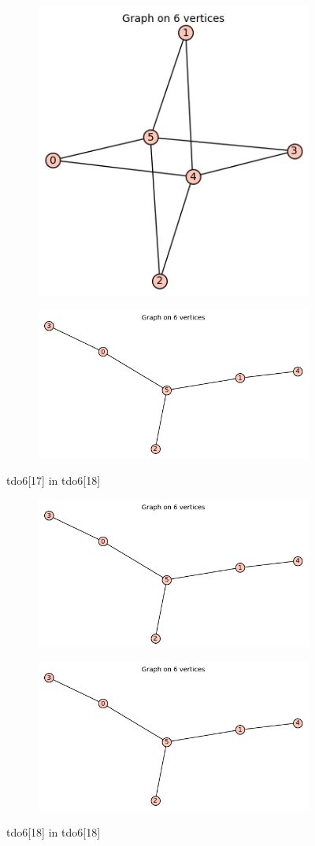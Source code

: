 \documentclass[12pt, a4paper]{article}
\begin{document}
\begin{center}
\begin{figure}[!htb]
\centering
\begin{subfigure}{0.5\textwidth}
  \centering
  \includegraphics[width=0.5\linewidth]{tdo6[17]}
\end{subfigure}%
\begin{subfigure}{0.5\textwidth}
  \centering
  \includegraphics[width=0.6\linewidth]{tdo6[18]}
\end{subfigure}
\caption{tdo6[17] in tdo6[18]}
\label{fig:test}
\end{figure}
\clearpage

\begin{figure}[!htb]
\centering
\begin{subfigure}{0.5\textwidth}
  \centering
  \includegraphics[width=0.5\linewidth]{tdo6[18]}
\end{subfigure}%
\begin{subfigure}{0.5\textwidth}
  \centering
  \includegraphics[width=0.5\linewidth]{tdo6[18]}
\end{subfigure}
\caption{tdo6[18] in tdo6[18]}
\label{fig:test}
\end{figure}

\end{center}
\end{document}
